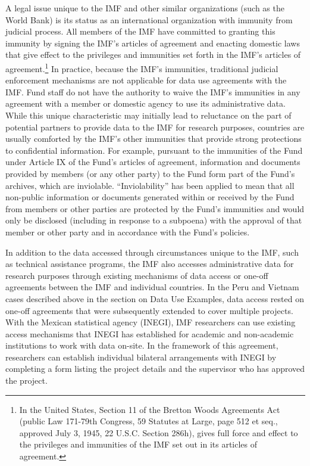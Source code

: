 A legal issue unique to the IMF and other similar organizations (such as the World Bank) is its status as an international organization with immunity from judicial process. All members of the IMF have committed to granting this immunity by signing the IMF's articles of agreement and enacting domestic laws that give effect to the privileges and immunities set forth in the IMF's articles of agreement.\footnote{In the United States, Section 11 of the Bretton Woods Agreements Act (public Law 171-79th Congress, 59 Statutes at Large, page 512 et seq., approved July 3, 1945, 22 U.S.C. Section 286h), gives full force and effect to the privileges and immunities of the IMF set out in its articles of agreement.} In practice, because the IMF's immunities, traditional judicial enforcement mechanisms are not applicable for data use agreements with the IMF. Fund staff do not have the authority to waive the IMF's immunities in any agreement with a member or domestic agency to use its administrative data. While this unique characteristic may initially lead to reluctance on the part of potential partners to provide data to the IMF for research purposes, countries are usually comforted by the IMF's other immunities that provide strong protections to confidential information. For example, pursuant to the immunities of the Fund under Article IX of the Fund's articles of agreement, information and documents provided by members (or any other party) to the Fund form part of the Fund's archives, which are inviolable. ``Inviolability'' has been applied to mean that all non-public information or documents generated within or received by the Fund from members or other parties are protected by the Fund's immunities and would only be disclosed (including in response to a subpoena) with the approval of that member or other party and in accordance with the Fund's policies.

In addition to the data accessed through circumstances unique to the IMF, such as technical assistance programs, the IMF also accesses administrative data for research purposes through existing mechanisms of data access or one-off agreements between the IMF and individual countries. In the Peru and Vietnam cases described above in the section on Data Use Examples, data access rested on one-off agreements that were subsequently extended to cover multiple projects. With the Mexican statistical agency (INEGI), IMF researchers can use existing access mechanisms that INEGI has established for academic and non-academic institutions to work with data on-site. In the framework of this agreement, researchers can establish individual bilateral arrangements with INEGI by completing a form listing the project details and the supervisor who has approved the project.

